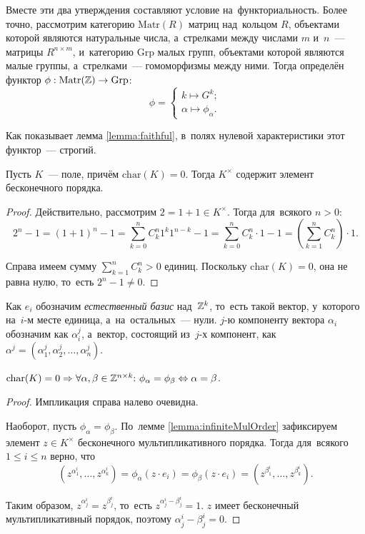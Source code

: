 \documentclass{article}
\begin{document}
Вместе эти два утверждения составляют условие на~функториальность. Более точно, рассмотрим категорию
$\mathrm{Matr}(R)$ матриц над~кольцом $R$, объектами которой являются натуральные числа, а~стрелками
между числами $m$ и~$n$~— матрицы $R^{n \times m}$, и~категорию $\mathrm{Grp}$ малых групп,
объектами которой являются малые группы, а~стрелками~— гомоморфизмы между ними.
Тогда определён функтор $\phi : \mathrm{Matr}(\mathbb{Z}) \rightarrow \mathrm{Grp}$:
$$
    \phi = \begin{cases}
        k \mapsto G^k; \\
        \alpha \mapsto \phi_\alpha.
    \end{cases}
$$

Как показывает лемма \ref{lemma:faithful}, в~полях нулевой характеристики этот функтор~— строгий.

\begin{lemma}
\label{lemma:infiniteMulOrder}
    Пусть $K$~— поле, причём $\mathrm{char}(K) = 0$.
    Тогда $K^\times$ содержит элемент бесконечного порядка.
\end{lemma}

\begin{proof}
    Действительно, рассмотрим $2 = 1 + 1 \in K^\times$. Тогда для~всякого $n > 0$:
    $$
        2^n - 1 = (1 + 1)^n - 1 = \sum_{k = 0}^n C^n_k 1^k 1^{n - k} - 1
                                = \sum_{k = 0}^n C^n_k \cdot 1 - 1
                                = \left(\sum_{k = 1}^n C^n_k \right) \cdot 1.
    $$

    Справа имеем сумму $\sum_{k = 1}^n C^n_k > 0$ единиц. Поскольку $\mathrm{char}(K) = 0$,
    она не равна нулю, то~есть $2^n - 1 \neq 0$.
\end{proof}

Как $e_i$ обозначим \textit{естественный базис} над~$\mathbb{Z}^k$, то~есть такой вектор, у~которого на~$i$-м месте единица, а~на~остальных~— нули.
$j$-ю компоненту вектора $\alpha_i$ обозначим как $\alpha_i^j$, а~вектор, состоящий из~$j$-х компонент,
как $\alpha^j = (\alpha_1^j, \alpha_2^j, \ldots, \alpha_n^j)$.

\begin{lemma}
\label{lemma:faithful}
    $
        \mathrm{char}(K) = 0 \Rightarrow \forall \alpha, \beta \in \mathbb{Z}^{n \times k}{:} \ \phi_\alpha = \phi_\beta \Leftrightarrow \alpha = \beta
    $.
\end{lemma}

\begin{proof}
    Импликация справа налево очевидна.

    Наоборот, пусть $\phi_\alpha = \phi_\beta$. По~лемме \ref{lemma:infiniteMulOrder} зафиксируем
    элемент $z \in K^\times$ бесконечного мультипликативного порядка.
    Тогда для~всякого $1 \leq i \leq n$ верно, что
    $$
        (z^{\alpha_1^i}, \ldots, z^{\alpha_k^i}) = \phi_\alpha(z \cdot e_i) = \phi_\beta(z \cdot e_i) = (z^{\beta_1^i}, \ldots, z^{\beta_k^i}).
    $$

    Таким образом, $z^{\alpha_j^i} = z^{\beta_j^i}$, то~есть $z^{\alpha_j^i - \beta_j^i} = 1$.
    $z$ имеет бесконечный мультипликативный порядок, поэтому $\alpha_j^i - \beta_j^i = 0$.
\end{proof}
\end{document}
